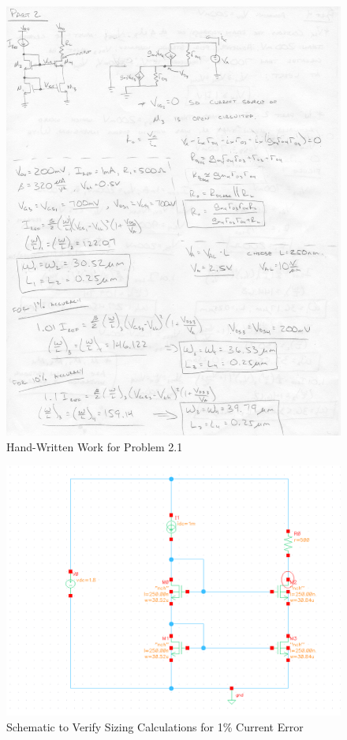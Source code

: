 \documentclass{article}
\begin{document}
\begin{figure}[H]
\centering
\includegraphics[width=6in]{1_5}
\caption{Hand-Written Work for Problem 2.1}
\label{2_1}
\end{figure}

\begin{figure}[H]
\centering
\includegraphics[width=6in]{p2_2_schem_1p.png}
\caption{Schematic to Verify Sizing Calculations for 1\% Current Error}
\label{2_2_schem}
\end{figure}
\end{document}
